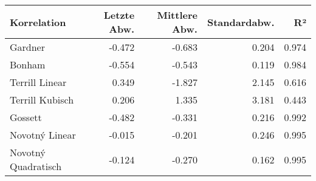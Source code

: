 \begin{tabular}{lrrrr}
\toprule
        Korrelation &  Letzte Abw. &  Mittlere Abw. &  Standardabw. &    R² \\
\midrule
            Gardner &       -0.472 &         -0.683 &         0.204 & 0.974 \\
             Bonham &       -0.554 &         -0.543 &         0.119 & 0.984 \\
     Terrill Linear &        0.349 &         -1.827 &         2.145 & 0.616 \\
    Terrill Kubisch &        0.206 &          1.335 &         3.181 & 0.443 \\
            Gossett &       -0.482 &         -0.331 &         0.216 & 0.992 \\
     Novotný Linear &       -0.015 &         -0.201 &         0.246 & 0.995 \\
Novotný Quadratisch &       -0.124 &         -0.270 &         0.162 & 0.995 \\
\bottomrule
\end{tabular}
